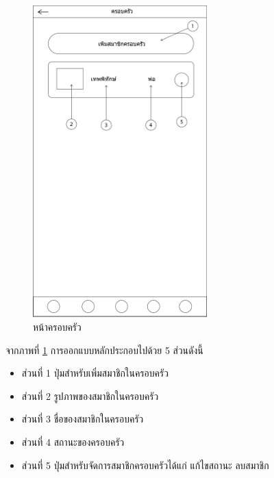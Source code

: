 		\begin{figure}[H]
			\centering
			\includegraphics[width=0.6\textwidth]{Figures/3/UI/family}
			\caption{หน้าครอบครัว}
			\label{Fig:ครอบครัว}
		\end{figure}
		จากภาพที่ \ref{Fig:ครอบครัว} การออกแบบหลักประกอบไปด้วย 5 ส่วนดังนี้
		\begin{itemize}
			\item ส่วนที่ 1 ปุ่มสำหรับเพิ่มสมาชิกในครอบครัว
			\item ส่วนที่ 2 รูปภาพของสมาชิกในครอบครัว
			\item ส่วนที่ 3 ชื่อของสมาชิกในครอบครัว
			\item ส่วนที่ 4 สถานะของครอบครัว
			\item ส่วนที่ 5 ปุ่มสำหรับจัดการสมาชิกครอบครัวได้แก่ แก้ไขสถานะ ลบสมาชิก
		\end{itemize}

